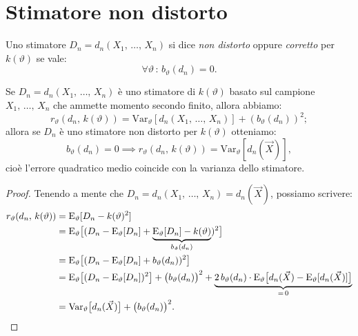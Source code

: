     \section{Stimatore non distorto}
        \begin{defn}
            Uno stimatore $D_n = d_n(X_1,\, \ldots,\, X_{n})$ si dice \emph{non distorto} oppure 
            \emph{corretto} per $k(\vartheta)$ se vale: \[
                \forall \vartheta \,:\, b_{\vartheta}(d_n) = 0
            .\]
        \end{defn}
        \begin{prty}
            Se $D_n = d_n(X_1,\, \ldots,\, X_{n})$ è uno stimatore di $k(\vartheta)$ basato sul campione 
             $X_1,\, \ldots,\, X_{n}$ che ammette momento secondo finito, allora abbiamo: \[
                 r_{\vartheta}(d_n,\, k(\vartheta)) = 
                 \text{Var}_{\vartheta}[d_n(X_1,\, \ldots,\, X_{n})] + (b_{\vartheta}(d_n))^2
             ;\] allora se $D_n$ è uno stimatore non distorto per $k(\vartheta)$ otteniamo: \[
                b_{\vartheta}(d_n) = 0 \implies r_{\vartheta}(d_n,\, k(\vartheta)) = 
                \text{Var}_{\vartheta}[d_n(\vec{X})]
             ,\] cioè l'errore quadratico medio coincide con la varianza dello stimatore.
        \end{prty}
        \begin{proof}
            Tenendo a mente che $D_n = d_n(X_1,\, \ldots,\, X_{n}) = d_n(\vec{X})$, possiamo scrivere:
            \begin{align*}
                r_{\vartheta}(d_n,\, k(\vartheta)) &= \text{E}_{\vartheta}[D_n -k(\vartheta)^2] \\
                &= \text{E}_{\vartheta}\big[(D_n - \text{E}_{\vartheta}[D_n] + \underset{b_{\vartheta}(d_n)}{\underbrace{\text{E}_{\vartheta}[D_n] - k(\vartheta)}})^2\big] \\
                &= \text{E}_{\vartheta}\big[(D_n - \text{E}_{\vartheta}[D_n] + b_{\vartheta}(d_n))^2\big] \\
                &= \text{E}_{\vartheta}\big[(D_n - \text{E}_{\vartheta}[D_n])^2\big] +
                \big(b_{\vartheta}(d_n)\big)^2 +
                \underset{=\, 0}{\underbrace{2\,b_{\vartheta}(d_n) \cdot \text{E}_{\vartheta}\big[d_n(\vec{X}) - \text{E}_{\vartheta}[d_n(\vec{X})]\big]}} \\
                &= \text{Var}_{\vartheta}\big[d_n(\vec{X})\big] + \big(b_{\vartheta}(d_n)\big)^2
            .\qedhere\end{align*}
        \end{proof}

